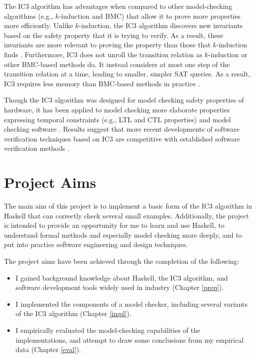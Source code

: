 \documentclass[12pt,a4paper,twoside,openright]{report}
\begin{document}
The IC3 algorithm has advantages when compared to other model-checking
algorithms (e.g., $k$-induction and BMC) that allow it to prove more
properties more efficiently. Unlike $k$-induction, the IC3 algorithm
discovers new invariants based on the safety property that it is trying to
verify. As a result, these
invariants are more relevant to proving the property than those that
$k$-induction finds \cite{bradley12}.
Furthermore, IC3 does not unroll the transition relation as $k$-induction
or other BMC-based methods do. It instead considers at most one step
of the transition relation at a time, leading to smaller,
simpler SAT queries. As a result, IC3 requires less memory than BMC-based
methods in practice \cite{bradley12}.


Though the IC3 algorithm was designed for model checking safety properties of hardware,
it has been applied to model checking more
elaborate properties expressing temporal constraints (e.g., LTL and CTL
properties) and model checking software
\cite{bradley12,cimatti12}.
Results suggest that more recent developments of software verification
techniques based on IC3 are competitive with
established software verification methods \cite{birgmeier14}.

\section{Project Aims}

The main aim of this project is to implement a basic form of the IC3 algorithm in
Haskell that can correctly check several
small examples. Additionally, the project is intended to provide an opportunity
for me to learn and use Haskell, to understand formal methods and especially model
checking more deeply, and to put into practice software engineering and design techniques.

The project aims have been achieved through the completion of the following:
\begin{itemize}
\item I gained background knowledge about Haskell, the IC3 algorithm, and software
development tools widely used in industry (Chapter \ref{prep}).
\item I implemented the components of a model checker, including several variants of
the IC3 algorithm (Chapter \ref{impl}).
\item I empirically evaluated the model-checking capabilities of the implementations,
and attempt to draw some conclusions from my empirical data
(Chapter \ref{eval}).
\end{itemize}
\end{document}
